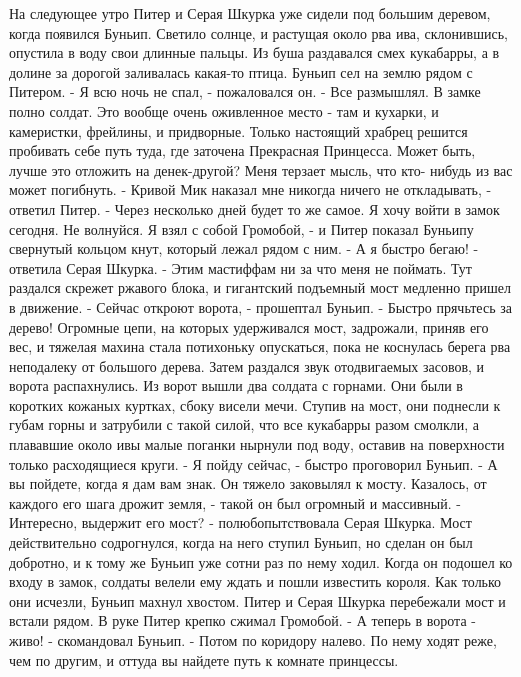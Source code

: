     На следующее утро Питер и Серая Шкурка уже сидели под большим 
деревом, когда появился Буньип. Светило солнце, и растущая около рва 
ива, склонившись, опустила в воду свои длинные пальцы. Из буша 
раздавался смех кукабарры, а в долине за дорогой заливалась какая-то 
птица.
    Буньип сел на землю рядом с Питером.
    - Я всю ночь не спал, - пожаловался он. - Все размышлял. В замке 
полно солдат. Это вообще очень оживленное место - там и кухарки, и 
камеристки, фрейлины, и придворные. Только настоящий храбрец решится 
пробивать себе путь туда, где заточена Прекрасная Принцесса. Может 
быть, лучше это отложить на денек-другой? Меня терзает мысль, что кто-
нибудь из вас может погибнуть.
    - Кривой Мик наказал мне никогда ничего не откладывать, - ответил 
Питер. - Через несколько дней будет то же самое. Я хочу войти в замок 
сегодня. Не волнуйся. Я взял с собой Громобой, - и Питер показал 
Буньипу свернутый кольцом кнут, который лежал рядом с ним.
    - А я быстро бегаю! - ответила Серая Шкурка. - Этим мастиффам ни 
за что меня не поймать.
    Тут раздался скрежет ржавого блока, и гигантский подъемный мост 
медленно пришел в движение.
    - Сейчас откроют ворота, - прошептал Буньип. - Быстро прячьтесь за 
дерево!
    Огромные цепи, на которых удерживался мост, задрожали, приняв его 
вес, и тяжелая махина стала потихоньку опускаться, пока не коснулась 
берега рва неподалеку от большого дерева. Затем раздался звук 
отодвигаемых засовов, и ворота распахнулись.
    Из ворот вышли два солдата с горнами. Они были в коротких кожаных 
куртках, сбоку висели мечи. Ступив на мост, они поднесли к губам горны 
и затрубили с такой силой, что все кукабарры разом смолкли, а 
плававшие около ивы малые поганки нырнули под воду, оставив на 
поверхности только расходящиеся круги.
    - Я пойду сейчас, - быстро проговорил Буньип. - А вы пойдете, 
когда я дам вам знак.
    Он тяжело заковылял к мосту. Казалось, от каждого его шага дрожит 
земля, - такой он был огромный и массивный.
    - Интересно, выдержит его мост? - полюбопытствовала Серая Шкурка.
    Мост действительно содрогнулся, когда на него ступил Буньип, но 
сделан он был добротно, и к тому же Буньип уже сотни раз по нему 
ходил. Когда он подошел ко входу в замок, солдаты велели ему ждать и 
пошли известить короля. Как только они исчезли, Буньип махнул хвостом. 
Питер и Серая Шкурка перебежали мост и встали рядом. В руке Питер 
крепко сжимал Громобой.
    - А теперь в ворота - живо! - скомандовал Буньип. - Потом по 
коридору налево. По нему ходят реже, чем по другим, и оттуда вы 
найдете путь к комнате принцессы.
